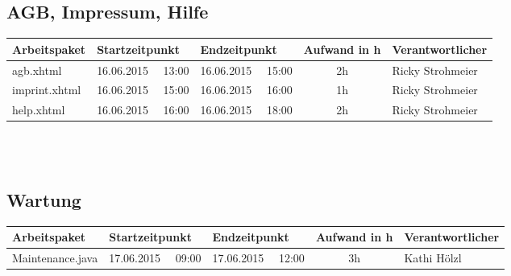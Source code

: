 \begin{landscape}
	\subsection{AGB, Impressum, Hilfe}
	\begin{tabular}{|p{10.3cm}|p{3.2cm}|p{3.2cm}|c|p{3.5cm}|}
		\hline  \textbf{Arbeitspaket} & \textbf{Startzeitpunkt} & \textbf{Endzeitpunkt} & \textbf{Aufwand in h} & \textbf{Verantwortlicher} \\ 
		\hline   agb.xhtml          & 16.06.2015 \ \ 13:00        & 16.06.2015 \ \ 15:00        &  2h                 & Ricky Strohmeier\\
		\hline   imprint.xhtml      & 16.06.2015 \ \ 15:00        & 16.06.2015 \ \ 16:00        &  1h                 & Ricky Strohmeier\\
		\hline   help.xhtml         & 16.06.2015 \ \ 16:00        & 16.06.2015 \ \ 18:00        &  2h                 & Ricky Strohmeier\\
		\hline 
	\end{tabular} \ \\
	\ \\	
	
	\subsection{Wartung}
	\begin{tabular}{|p{10.3cm}|p{3.2cm}|p{3.2cm}|c|p{3.5cm}|}
		\hline  \textbf{Arbeitspaket} & \textbf{Startzeitpunkt} & \textbf{Endzeitpunkt} & \textbf{Aufwand in h} & \textbf{Verantwortlicher} \\ 
		\hline   Maintenance.java         & 17.06.2015 \ \ 09:00       & 17.06.2015  \ \  12:00      &  3h                & Kathi Hölzl\\
		\hline
	\end{tabular}				
\end{landscape}